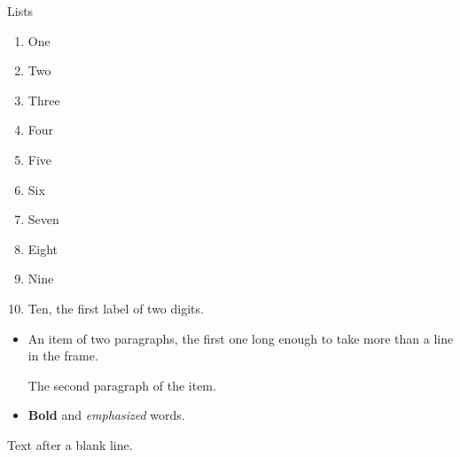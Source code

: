 \documentclass[8pt]{beamer}
\begin{document}
\begin{frame}{Lists}
\begin{enumerate}
\item One
\item Two
\item Three
\item Four
\item Five
\item Six
\item Seven
\item Eight
\item Nine
\item Ten, the first label of two digits.
\end{enumerate}
\begin{itemize}
\item An item of two paragraphs, the first one long enough to take more than a line in the frame.

The second paragraph of the item.
\item \textbf{Bold} and \emph{emphasized} words.
\end{itemize}

Text after a blank line.
\end{frame}
\end{document}
